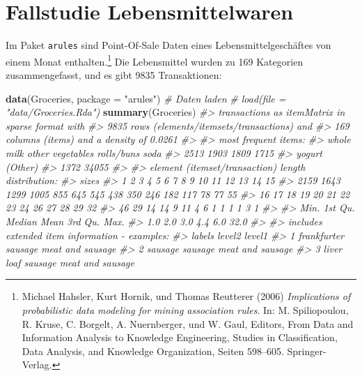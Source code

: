 \documentclass[12pt,]{book}
\makeatletter
\newenvironment{Shaded}{\begin{snugshade}}{\end{snugshade}}
\newcommand{\KeywordTok}[1]{\textcolor[rgb]{0.13,0.29,0.53}{\textbf{{#1}}}}
\newcommand{\DataTypeTok}[1]{\textcolor[rgb]{0.13,0.29,0.53}{{#1}}}
\newcommand{\StringTok}[1]{\textcolor[rgb]{0.31,0.60,0.02}{{#1}}}
\newcommand{\CommentTok}[1]{\textcolor[rgb]{0.56,0.35,0.01}{\textit{{#1}}}}
\newcommand{\NormalTok}[1]{{#1}}
\newenvironment{kframe}{%
\medskip{}
\setlength{\fboxsep}{.8em}
 \def\at@end@of@kframe{}%
 \ifinner\ifhmode%
  \def\at@end@of@kframe{\end{minipage}}%
  \begin{minipage}{\columnwidth}%
 \fi\fi%
 \def\FrameCommand##1{\hskip\@totalleftmargin \hskip-\fboxsep
 \colorbox{shadecolor}{##1}\hskip-\fboxsep
     \hskip-\linewidth \hskip-\@totalleftmargin \hskip\columnwidth}%
 \MakeFramed {\advance\hsize-\width
   \@totalleftmargin\z@ \linewidth\hsize
   \@setminipage}}%
 {\par\unskip\endMakeFramed%
 \at@end@of@kframe}
\renewenvironment{Shaded}{\begin{kframe}}{\end{kframe}}
\makeatother
\begin{document}
\section{Fallstudie
Lebensmittelwaren}\label{fallstudie-lebensmittelwaren}

Im Paket \texttt{arules} sind Point-Of-Sale Daten eines
Lebensmittelgeschäftes von einem Monat enthalten.\footnote{Michael
  Hahsler, Kurt Hornik, und Thomas Reutterer (2006) \emph{Implications
  of probabilistic data modeling for mining association rules}. In: M.
  Spiliopoulou, R. Kruse, C. Borgelt, A. Nuernberger, und W. Gaul,
  Editors, From Data and Information Analysis to Knowledge Engineering,
  Studies in Classification, Data Analysis, and Knowledge Organization,
  Seiten 598--605. Springer-Verlag.} Die Lebensmittel wurden zu 169
Kategorien zusammengefasst, und es gibt 9835 Transaktionen:

\begin{Shaded}
\begin{Highlighting}[]
\KeywordTok{data}\NormalTok{(Groceries, }\DataTypeTok{package =} \StringTok{"arules"}\NormalTok{) }\CommentTok{# Daten laden}
\CommentTok{# load(file = "data/Groceries.Rda")}
\KeywordTok{summary}\NormalTok{(Groceries)}
\CommentTok{#> transactions as itemMatrix in sparse format with}
\CommentTok{#>  9835 rows (elements/itemsets/transactions) and}
\CommentTok{#>  169 columns (items) and a density of 0.0261 }
\CommentTok{#> }
\CommentTok{#> most frequent items:}
\CommentTok{#>       whole milk other vegetables       rolls/buns             soda }
\CommentTok{#>             2513             1903             1809             1715 }
\CommentTok{#>           yogurt          (Other) }
\CommentTok{#>             1372            34055 }
\CommentTok{#> }
\CommentTok{#> element (itemset/transaction) length distribution:}
\CommentTok{#> sizes}
\CommentTok{#>    1    2    3    4    5    6    7    8    9   10   11   12   13   14   15 }
\CommentTok{#> 2159 1643 1299 1005  855  645  545  438  350  246  182  117   78   77   55 }
\CommentTok{#>   16   17   18   19   20   21   22   23   24   26   27   28   29   32 }
\CommentTok{#>   46   29   14   14    9   11    4    6    1    1    1    1    3    1 }
\CommentTok{#> }
\CommentTok{#>    Min. 1st Qu.  Median    Mean 3rd Qu.    Max. }
\CommentTok{#>     1.0     2.0     3.0     4.4     6.0    32.0 }
\CommentTok{#> }
\CommentTok{#> includes extended item information - examples:}
\CommentTok{#>        labels  level2           level1}
\CommentTok{#> 1 frankfurter sausage meat and sausage}
\CommentTok{#> 2     sausage sausage meat and sausage}
\CommentTok{#> 3  liver loaf sausage meat and sausage}
\end{Highlighting}
\end{Shaded}
\end{document}
